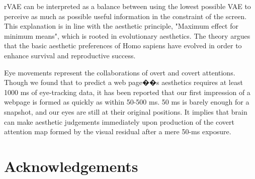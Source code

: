 rVAE can be interpreted as a balance between using the lowest possible VAE to perceive as much as possible useful information in the constraint of the screen. This explanation is in line with the aesthetic principle, "Maximum effect for minimum means"\cite{Hekkert2006}, which is rooted in evolutionary aesthetics\cite{Shimamura2012}. The theory argues that the basic aesthetic preferences of Homo sapiens have evolved in order to enhance survival and reproductive success.

Eye movements represent the collaborations of overt and covert attentions. Though we found that to predict a web page��s aesthetics requires at least 1000 ms of eye-tracking data, it has been reported that our first impression of a webpage is formed as quickly as within 50-500 ms\cite{Lindgaard2006}. 50 ms is barely enough for a snapshot, and our eyes are still at their original positions. It implies that brain can make aesthetic judgements immediately upon production of the covert attention map formed by the visual residual after a mere 50-ms exposure.

\section{Acknowledgements}



